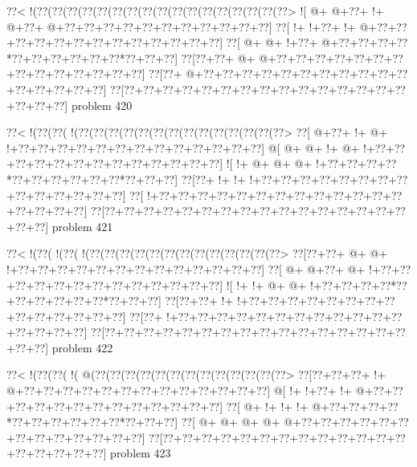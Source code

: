 \vbox{\vbox{\goo
\0??<\- !(\0??(\0??(\0??(\0??(\0??(\0??(\0??(\0??(\0??(\0??(\0??(\0??(\0??(\0??(\0??(\0??(\0??>
\- ![\- @+\- @+\0??+\- !+\- @+\0??+\- @+\0??+\0??+\0??+\0??+\0??+\0??+\0??+\0??+\0??+\0??+\0??]
\0??[\- !+\- !+\0??+\- !+\- @+\0??+\0??+\0??+\0??+\0??+\0??+\0??+\0??+\0??+\0??+\0??+\0??+\0??]
\0??[\- @+\- @+\- !+\0??+\- @+\0??+\0??+\0??+\0??*\0??+\0??+\0??+\0??+\0??+\0??*\0??+\0??+\0??]
\0??[\0??+\0??+\- @+\- @+\0??+\0??+\0??+\0??+\0??+\0??+\0??+\0??+\0??+\0??+\0??+\0??+\0??+\0??]
\0??[\0??+\- @+\0??+\0??+\0??+\0??+\0??+\0??+\0??+\0??+\0??+\0??+\0??+\0??+\0??+\0??+\0??+\0??]
\0??[\0??+\0??+\0??+\0??+\0??+\0??+\0??+\0??+\0??+\0??+\0??+\0??+\0??+\0??+\0??+\0??+\0??+\0??]
}
\hfil problem 420\hfil\break
}



\vbox{\vbox{\goo
\0??<\- !(\0??(\0??(\- !(\0??(\0??(\0??(\0??(\0??(\0??(\0??(\0??(\0??(\0??(\0??(\0??(\0??(\0??>
\0??[\- @+\0??+\- !+\- @+\- !+\0??+\0??+\0??+\0??+\0??+\0??+\0??+\0??+\0??+\0??+\0??+\0??+\0??]
\- @[\- @+\- @+\- !+\- @+\- !+\0??+\0??+\0??+\0??+\0??+\0??+\0??+\0??+\0??+\0??+\0??+\0??+\0??]
\- ![\- !+\- @+\- @+\- @+\- !+\0??+\0??+\0??+\0??*\0??+\0??+\0??+\0??+\0??+\0??*\0??+\0??+\0??]
\0??[\0??+\- !+\- !+\- !+\0??+\0??+\0??+\0??+\0??+\0??+\0??+\0??+\0??+\0??+\0??+\0??+\0??+\0??]
\0??[\- !+\0??+\0??+\0??+\0??+\0??+\0??+\0??+\0??+\0??+\0??+\0??+\0??+\0??+\0??+\0??+\0??+\0??]
\0??[\0??+\0??+\0??+\0??+\0??+\0??+\0??+\0??+\0??+\0??+\0??+\0??+\0??+\0??+\0??+\0??+\0??+\0??]
}
\hfil problem 421\hfil\break
}



\vbox{\vbox{\goo
\0??<\- !(\0??(\- !(\0??(\- !(\0??(\0??(\0??(\0??(\0??(\0??(\0??(\0??(\0??(\0??(\0??(\0??(\0??>
\0??[\0??+\0??+\- @+\- @+\- !+\0??+\0??+\0??+\0??+\0??+\0??+\0??+\0??+\0??+\0??+\0??+\0??+\0??]
\0??[\- @+\- @+\0??+\- @+\- !+\0??+\0??+\0??+\0??+\0??+\0??+\0??+\0??+\0??+\0??+\0??+\0??+\0??]
\- ![\- !+\- !+\- @+\- @+\- !+\0??+\0??+\0??+\0??*\0??+\0??+\0??+\0??+\0??+\0??*\0??+\0??+\0??]
\0??[\0??+\0??+\- !+\- !+\0??+\0??+\0??+\0??+\0??+\0??+\0??+\0??+\0??+\0??+\0??+\0??+\0??+\0??]
\0??[\0??+\- !+\0??+\0??+\0??+\0??+\0??+\0??+\0??+\0??+\0??+\0??+\0??+\0??+\0??+\0??+\0??+\0??]
\0??[\0??+\0??+\0??+\0??+\0??+\0??+\0??+\0??+\0??+\0??+\0??+\0??+\0??+\0??+\0??+\0??+\0??+\0??]
}
\hfil problem 422\hfil\break
}



\vbox{\vbox{\goo
\0??<\- !(\0??(\0??(\- !(\- @(\0??(\0??(\0??(\0??(\0??(\0??(\0??(\0??(\0??(\0??(\0??(\0??(\0??>
\0??[\0??+\0??+\0??+\- !+\- @+\0??+\0??+\0??+\0??+\0??+\0??+\0??+\0??+\0??+\0??+\0??+\0??+\0??]
\- @[\- !+\- !+\0??+\- !+\- @+\0??+\0??+\0??+\0??+\0??+\0??+\0??+\0??+\0??+\0??+\0??+\0??+\0??]
\0??[\- @+\- !+\- !+\- !+\- @+\0??+\0??+\0??+\0??*\0??+\0??+\0??+\0??+\0??+\0??*\0??+\0??+\0??]
\0??[\- @+\- @+\- @+\- @+\- @+\0??+\0??+\0??+\0??+\0??+\0??+\0??+\0??+\0??+\0??+\0??+\0??+\0??]
\0??[\0??+\0??+\0??+\0??+\0??+\0??+\0??+\0??+\0??+\0??+\0??+\0??+\0??+\0??+\0??+\0??+\0??+\0??]
}
\hfil problem 423\hfil\break
}



